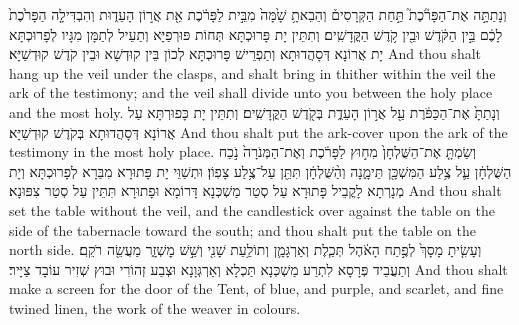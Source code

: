 {וְנָתַתָּ֣ה אֶת־הַפָּרֹ֘כֶת֮ תַּ֣חַת הַקְּרָסִים֒ וְהֵבֵאתָ֥ שָׁ֙מָּה֙ מִבֵּ֣ית לַפָּרֹ֔כֶת אֵ֖ת אֲר֣וֹן הָעֵד֑וּת וְהִבְדִּילָ֤ה הַפָּרֹ֙כֶת֙ לָכֶ֔ם בֵּ֣ין הַקֹּ֔דֶשׁ וּבֵ֖ין קֹ֥דֶשׁ הַקֳּדָשִֽׁים׃}
{וְתִתֵּין יָת פָּרוּכְתָּא תְּחוֹת פּוּרְפַיָּא וְתַעֵיל לְתַמָּן מִגָּיו לְפָרוּכְתָּא יָת אֲרוֹנָא דְּסָהֲדוּתָא וְתַפְרֵישׁ פָּרוּכְתָּא לְכוֹן בֵּין קוּדְשָׁא וּבֵין קֹדֶשׁ קוּדְשַׁיָּא׃}
{And thou shalt hang up the veil under the clasps, and shalt bring in thither within the veil the ark of the testimony; and the veil shall divide unto you between the holy place and the most holy.}{}
{וְנָתַתָּ֙ אֶת־הַכַּפֹּ֔רֶת עַ֖ל אֲר֣וֹן הָעֵדֻ֑ת בְּקֹ֖דֶשׁ הַקֳּדָשִֽׁים׃}
{וְתִתֵּין יָת כָּפוּרְתָּא עַל אֲרוֹנָא דְּסָהֲדוּתָא בְּקֹדֶשׁ קוּדְשַׁיָּא׃}
{And thou shalt put the ark-cover upon the ark of the testimony in the most holy place.}{}
{וְשַׂמְתָּ֤ אֶת־הַשֻּׁלְחָן֙ מִח֣וּץ לַפָּרֹ֔כֶת וְאֶת־הַמְּנֹרָה֙ נֹ֣כַח הַשֻּׁלְחָ֔ן עַ֛ל צֶ֥לַע הַמִּשְׁכָּ֖ן תֵּימָ֑נָה וְהַ֨שֻּׁלְחָ֔ן תִּתֵּ֖ן עַל־צֶ֥לַע צָפֽוֹן׃
}
{וּתְשַׁוֵּי יָת פָּתוּרָא מִבַּרָא לְפָרוּכְתָּא וְיָת מְנָרְתָא לָקֳבֵיל פָּתוּרָא עַל סְטַר מַשְׁכְּנָא דָּרוֹמָא וּפָתוּרָא תִּתֵּין עַל סְטַר צִפּוּנָא׃}
{And thou shalt set the table without the veil, and the candlestick over against the table on the side of the tabernacle toward the south; and thou shalt put the table on the north side.}{}
{וְעָשִׂ֤יתָ מָסָךְ֙ לְפֶ֣תַח הָאֹ֔הֶל תְּכֵ֧לֶת וְאַרְגָּמָ֛ן וְתוֹלַ֥עַת שָׁנִ֖י וְשֵׁ֣שׁ מׇשְׁזָ֑ר מַעֲשֵׂ֖ה רֹקֵֽם׃
}
{וְתַעֲבֵיד פְּרָסָא לִתְרַע מַשְׁכְּנָא תַּכְלָא וְאַרְגְּוָנָא וּצְבַע זְהוֹרִי וּבוּץ שְׁזִיר עוֹבָד צַיָּיר׃}
{And thou shalt make a screen for the door of the Tent, of blue, and purple, and scarlet, and fine twined linen, the work of the weaver in colours.}{}
